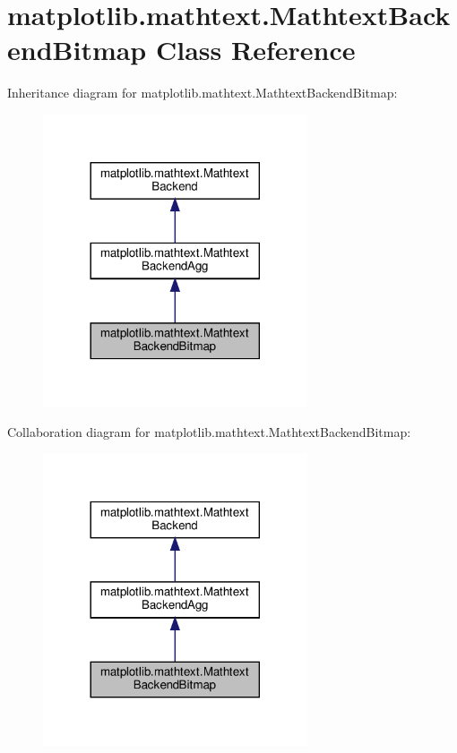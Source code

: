 \hypertarget{classmatplotlib_1_1mathtext_1_1MathtextBackendBitmap}{}\section{matplotlib.\+mathtext.\+Mathtext\+Backend\+Bitmap Class Reference}
\label{classmatplotlib_1_1mathtext_1_1MathtextBackendBitmap}


Inheritance diagram for matplotlib.\+mathtext.\+Mathtext\+Backend\+Bitmap\+:
\nopagebreak
\begin{figure}[H]
\begin{center}
\leavevmode
\includegraphics[width=221pt]{classmatplotlib_1_1mathtext_1_1MathtextBackendBitmap__inherit__graph}
\end{center}
\end{figure}


Collaboration diagram for matplotlib.\+mathtext.\+Mathtext\+Backend\+Bitmap\+:
\nopagebreak
\begin{figure}[H]
\begin{center}
\leavevmode
\includegraphics[width=221pt]{classmatplotlib_1_1mathtext_1_1MathtextBackendBitmap__coll__graph}
\end{center}
\end{figure}
